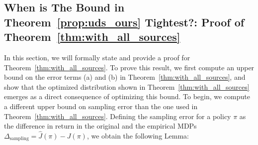 \subsection{When is The Bound in Theorem~\ref{prop:uds_ours} Tightest?: Proof of Theorem~\ref{thm:with_all_sources}}
\label{proof:all_sources}
In this section, we will formally state and provide a proof for Theorem~\ref{thm:with_all_sources}. To prove this result, we first compute an upper bound on the error terms (a) and (b) in Theorem~\ref{thm:with_all_sources}, and show that the optimized distribution shown in Theorem~\ref{thm:with_all_sources} emerges as a direct consequence of optimizing this bound. To begin, we compute a different upper bound on sampling error than the one used in Theorem~\ref{thm:with_all_sources}. Defining the sampling error for a policy $\pi$ as the difference in return in the original and the empirical MDPs $\Delta_\text{sampling} = \widehat{J}(\pi) - J(\pi)$, we obtain the following Lemma:

